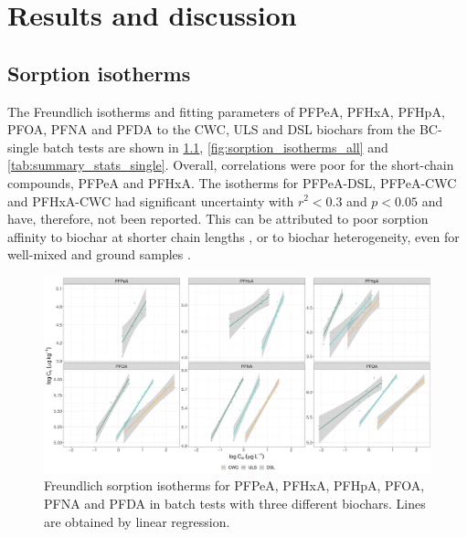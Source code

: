 \chapter{Results and discussion}\label{chap:Results&Disc}
\section{Sorption isotherms}
The Freundlich isotherms and fitting parameters of PFPeA, PFHxA, PFHpA, PFOA, PFNA and PFDA to the CWC, ULS and DSL biochars from the BC-single batch tests are shown in \cref{fig:sorption_isotherms}, \cref{fig:sorption_isotherms_all} and  \cref{tab:summary_stats_single}. Overall, correlations were poor for the short-chain compounds, PFPeA and PFHxA. The isotherms for PFPeA-DSL, PFPeA-CWC and PFHxA-CWC had significant uncertainty with $r^2 < 0.3$ and $p < 0.05$ and have, therefore, not been reported. This can be attributed to poor sorption affinity to biochar at shorter chain lengths \citep{zhang2021sorption}, or to biochar heterogeneity, even for well-mixed and ground samples \citep{Hale2011}. 

\begin{figure}[tb]
    \centering
    \includegraphics[width=\textwidth]{R/figs/Sorption_isotherms_single_BC.pdf}
    \caption{Freundlich sorption isotherms for PFPeA, PFHxA, PFHpA, PFOA, PFNA and PFDA in batch tests with three different biochars. Lines are obtained by linear regression.}
    \label{fig:sorption_isotherms}
\end{figure}

